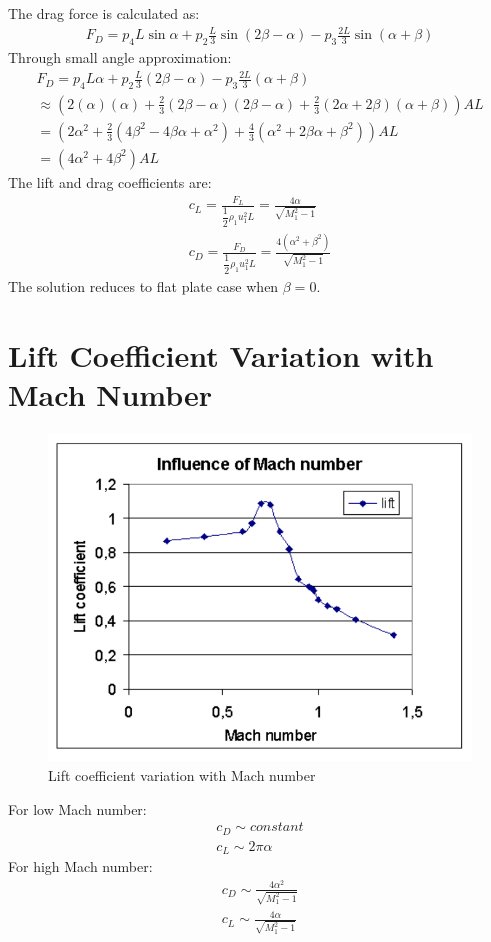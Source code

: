 The drag force is calculated as:
\begin{gather}
    F_D = p_4L\sin\alpha + p_2\frac{L}{3}\sin(2\beta-\alpha) - p_3\frac{2L}{3}\sin(\alpha+\beta)
\end{gather}
Through small angle approximation:
\begin{gather}
    F_D = p_4L\alpha + p_2\frac{L}{3}(2\beta-\alpha) - p_3\frac{2L}{3}(\alpha+\beta) \\[5pt]
    \approx \left( 2(\alpha)(\alpha) + \frac{2}{3}(2\beta-\alpha)(2\beta-\alpha) + \frac{2}{3}(2\alpha+2\beta)(\alpha+\beta) \right) AL \\[5pt]
    = \left( 2\alpha^2 + \frac{2}{3}(4\beta^2-4\beta\alpha+\alpha^2) + \frac{4}{3}(\alpha^2+2\beta\alpha+\beta^2) \right) AL \\[5pt]
    = (4\alpha^2+4\beta^2)AL
\end{gather}
The lift and drag coefficients are:
\begin{gather}
    c_L = \frac{F_L}{\dfrac{1}{2}\rho_1 u_1^2 L} = \frac{4\alpha}{\sqrt{M_1^2-1}} \\[5pt]
    c_D = \frac{F_D}{\dfrac{1}{2}\rho_1 u_1^2 L} = \frac{4(\alpha^2+\beta^2)}{\sqrt{M_1^2-1}}
\end{gather}
The solution reduces to flat plate case when $\beta = 0$.
\section{Lift Coefficient Variation with Mach Number}
\begin{figure}[H]
    \centering
    \includegraphics[width = 0.65 \textwidth]{./img/diagram36.png}
    \caption{Lift coefficient variation with Mach number}
\end{figure}
For low Mach number:
\begin{gather}
    c_D \sim constant \\[5pt]
    c_L \sim 2\pi\alpha
\end{gather}
For high Mach number:
\begin{gather}
    c_D \sim \frac{4\alpha^2}{\sqrt{M_1^2-1}} \\[5pt]
    c_L \sim \frac{4\alpha}{\sqrt{M_1^2-1}}
\end{gather}